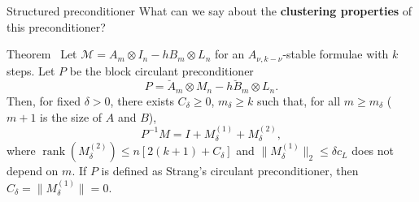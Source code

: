 \documentclass[aspectratio=169,xcolor=dvipsnames]{beamer}
\begin{document}
\begin{frame}{Structured preconditioner}
\alert{\faQuestionCircle}\;What can we say about the \alert{\textbf{clustering properties}} of this preconditioner?

\begin{alertblock}{Theorem~\parencite[Theorem~4.1]{MR1784824}}
Let $\mathcal{M} = A_m \otimes I_n - h B_m \otimes L_n$ for an $A_{\nu,k-\nu}$-stable formulae with $k$ steps. Let $P$ be the block circulant preconditioner
\[
P = \breve{A}_m \otimes M_n -h \breve{B}_m \otimes L_n.
\]
Then, for fixed $\delta > 0$, there exists $C_\delta \geq 0$, $m_\delta \geq k$ such that, for all $m \geq m_\delta$ ($m+1$ is the size of $A$ and $B$),
\[
P^{-1} M = I + M_\delta^{(1)} + M_{\delta}^{(2)},
\] 
where $\operatorname{rank}(M_\delta^{(2)}) \leq n[2(k+1) + C_\delta]$ and $\| M_\delta^{(1)}\|_2 \leq \delta c_L$ does not depend on $m$. If $P$ is defined as Strang's circulant preconditioner, then $C_\delta = \| M_\delta^{(1)}\| = 0$.
\end{alertblock}

\end{frame}
\end{document}

